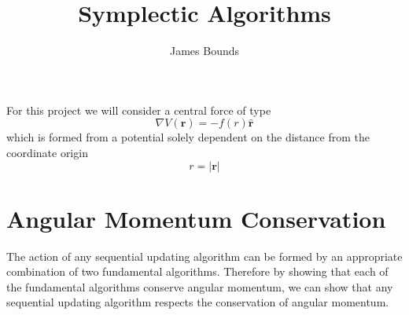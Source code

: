 \documentclass[8pt,a4paper]{article}
\begin{document}
	
	\title{Symplectic Algorithms}
	\author{James Bounds}
	\maketitle
	
	For this project we will consider a central force of type
	\begin{equation}
		\nabla V(\mathbf{r}) = -f(r) \mathbf{\hat{r}}
	\end{equation}
	which is formed from a potential solely dependent on the distance from the coordinate origin
	\begin{equation}
		r=|\mathbf{r}|
	\end{equation}
	
	\section{Angular Momentum Conservation}
	The action of any sequential updating algorithm can be formed by an appropriate combination of two fundamental algorithms. Therefore by showing that each of the fundamental algorithms conserve angular momentum, we can show that any sequential updating algorithm respects the conservation of angular momentum.
\end{document}
